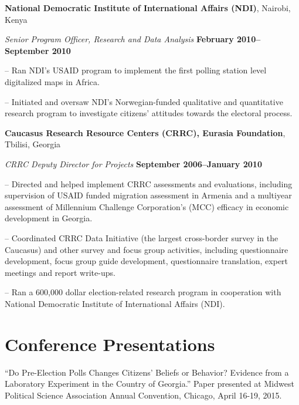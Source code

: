 \documentclass[margin,line]{res}
\newenvironment{list1}{
  \begin{list}{\ding{113}}{%
      \setlength{\itemsep}{0in}
      \setlength{\parsep}{0in} \setlength{\parskip}{0in}
      \setlength{\topsep}{0in} \setlength{\partopsep}{0in} 
      \setlength{\leftmargin}{0.17in}}}{\end{list}}
\begin{document}
{\begin{resume}
{\bf National Democratic Institute of International Affairs (NDI)}, Nairobi, Kenya
\vspace{-.3cm}

{\em Senior Program Officer, Research and Data Analysis} \hfill {\bf
  February 2010--September 2010}\\
\vspace{-.3cm}
\begin{list1} 
\item[]-- Ran NDI's  USAID program to implement the first polling station level
digitalized maps in Africa.
\item[]-- Initiated and oversaw NDI's
Norwegian-funded qualitative and quantitative research program to
investigate citizens' attitudes towards the electoral process.
\end{list1}
{\bf Caucasus Research Resource Centers (CRRC), Eurasia Foundation},
Tbilisi, Georgia

\vspace{-.3cm}
{\em CRRC Deputy Director for Projects} \hfill {\bf
  September 2006--January 2010}\\

\vspace{-.3cm}
\begin{list1} 
\item[]-- Directed and helped implement CRRC assessments and evaluations,
  including supervision of USAID funded migration assessment in
  Armenia and a multiyear assessment of Millennium Challenge
  Corporation's (MCC) efficacy in economic development in
  Georgia. 
\item[]-- Coordinated CRRC Data Initiative (the largest cross-border
  survey in the Caucasus) and other survey and focus group activities,
  including questionnaire development, focus group guide development,
  questionnaire translation, expert meetings and report write-ups. 
\item[]-- Ran a 600,000 dollar election-related research program in
  cooperation with National Democratic Institute of International
  Affairs (NDI).
\end{list1}

\section{\sc Conference Presentations}
``Do Pre-Election Polls Changes Citizens' Beliefs or Behavior?
Evidence from a Laboratory Experiment in the Country of Georgia.''
Paper presented at Midwest Political Science Association Annual
Convention, Chicago, April 16-19, 2015.


\end{resume}}
\end{document}
